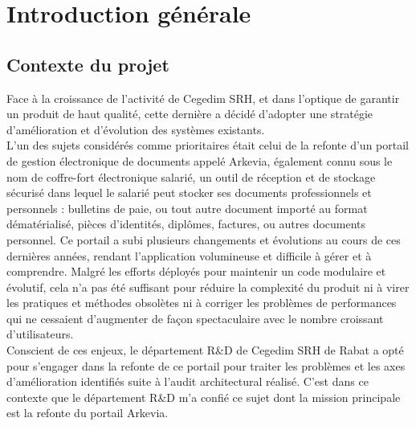 {}
\noindent \section*{Introduction générale}

{}
\subsection*{Contexte du projet}
Face à la croissance de l'activité de Cegedim SRH, et dans l’optique de garantir un produit de haut qualité, cette dernière a décidé d’adopter une stratégie d’amélioration et d’évolution des systèmes existants.\\

L'un des sujets considérés comme prioritaires était celui de la refonte d'un portail de gestion électronique de documents appelé Arkevia, également connu sous le nom de coffre-fort électronique salarié, un outil de réception et de stockage sécurisé dans lequel le salarié peut stocker ses documents professionnels et personnels : bulletins de paie, ou tout autre document importé au format dématérialisé, pièces d'identités, diplômes, factures, ou autres documents personnel. Ce portail a subi plusieurs changements et évolutions au cours de ces dernières années, rendant l'application volumineuse et difficile à gérer et à comprendre. Malgré les efforts déployés pour maintenir un code modulaire et évolutif, cela n'a pas été suffisant pour réduire la complexité du produit ni à virer les pratiques et méthodes obsolètes ni à corriger les problèmes de performances qui ne cessaient d'augmenter de façon spectaculaire avec le nombre croissant d'utilisateurs.\\

Conscient de ces enjeux, le département R\&D de Cegedim SRH de Rabat a opté pour s'engager dans la refonte de ce portail pour traiter les problèmes et les axes d’amélioration identifiés suite à l’audit architectural réalisé. C'est dans ce contexte que le département R\&D m'a confié ce sujet dont la mission principale est la refonte du portail Arkevia.
